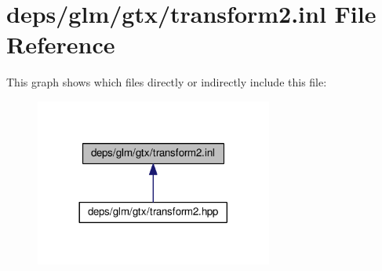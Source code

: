 \hypertarget{transform2_8inl}{}\section{deps/glm/gtx/transform2.inl File Reference}
\label{transform2_8inl}
This graph shows which files directly or indirectly include this file\+:
\nopagebreak
\begin{figure}[H]
\begin{center}
\leavevmode
\includegraphics[width=221pt]{da/dea/transform2_8inl__dep__incl}
\end{center}
\end{figure}
